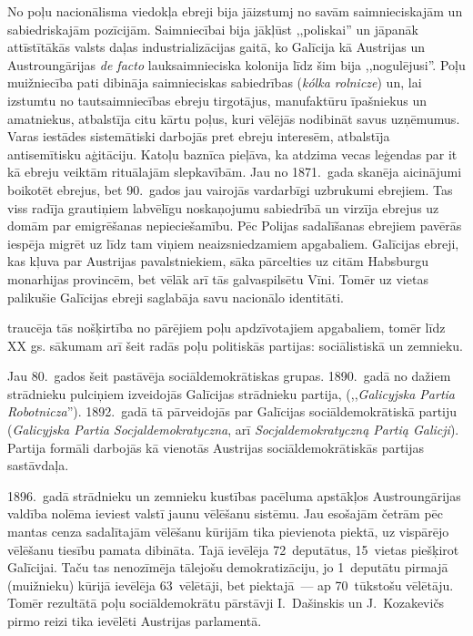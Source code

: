 \documentclass[twoside,a5paper,12pt,fleqn,openany]{extbook}
\newcommand{\pltxti}[1]{\textit{\textpolish{#1}}}
\newcommand{\latxti}[1]{\textit{\textlatin{#1}}}
\begin{document}
No poļu nacionālisma viedokļa ebreji bija jāizstumj no savām saimnieciskajām un sabiedriskajām pozīcijām. Saimniecībai bija jākļūst ,,poliskai'' un jāpanāk attīstītākās valsts daļas industrializācijas gaitā, ko Galīcija kā Austrijas un Austroungārijas \latxti{de facto} lauksaimnieciska kolonija līdz šim bija ,,nogulējusi''. Poļu muižniecība pati dibināja saimnieciskas sabiedrības (\pltxti{kólka rolnicze}) un, lai izstumtu no tautsaimniecības ebreju tirgotājus, manufaktūru īpašniekus un amatniekus, atbalstīja citu kārtu poļus, kuri vēlējās nodibināt savus uzņēmumus. Varas iestādes sistemātiski darbojās pret ebreju interesēm, atbalstīja antisemītisku aģitāciju. Katoļu baznīca pieļāva, ka atdzima vecas leģendas par it kā ebreju veiktām rituālajām slepkavībām. Jau no 1871.~gada skanēja aicinājumi boikotēt ebrejus, bet 90.~gados jau vairojās vardarbīgi uzbrukumi ebrejiem. Tas viss radīja grautiņiem labvēlīgu noskaņojumu sabiedrībā un virzīja ebrejus uz domām par emigrēšanas nepieciešamību. Pēc Polijas sadalīšanas ebrejiem pavērās iespēja migrēt uz līdz tam viņiem neaizsniedzamiem apgabaliem. Galīcijas ebreji, kas kļuva par Austrijas pavalstniekiem, sāka pārcelties uz citām Habsburgu monarhijas provincēm, bet vēlāk arī tās galvaspilsētu Vīni. Tomēr uz vietas palikušie Galīcijas ebreji saglabāja savu nacionālo identitāti.

 traucēja tās nošķirtība no pārējiem poļu apdzīvotajiem apgabaliem, tomēr līdz XX gs. sākumam arī šeit radās poļu politiskās partijas: sociālistiskā un zemnieku.

Jau 80.~gados šeit pastāvēja sociāldemokrātiskas grupas. 1890.~gadā no dažiem strādnieku pulciņiem izveidojās Galīcijas strādnieku partija, (,,\pltxti{Galicyjska Partia Robotnicza}''). 1892.~gadā tā pārveidojās par Galīcijas sociāldemokrātiskā partiju (\pltxti{Galicyjska Partia Socjaldemokratyczna}, arī \pltxti{Socjaldemokratyczną Partią Galicji}). Partija formāli darbojās kā vienotās Austrijas sociāldemokrātiskās partijas sastāvdaļa.

1896.~gadā strādnieku un zemnieku kustības pacēluma apstākļos Austroungārijas valdība nolēma ieviest valstī jaunu vēlēšanu sistēmu. Jau esošajām četrām pēc mantas cenza sadalītajām vēlēšanu kūrijām tika pievienota piektā, uz vispārējo vēlēšanu tiesību pamata dibināta. Tajā ievēlēja 72~deputātus, 15~vietas piešķirot Galīcijai. Taču tas nenozīmēja tālejošu demokratizāciju, jo 1~deputātu pirmajā (muižnieku) kūrijā ievēlēja 63~vēlētāji, bet piektajā~--- ap 70~tūkstošu vēlētāju. Tomēr rezultātā poļu sociāldemokrātu pārstāvji I.~Dašinskis un J.~Kozakevičs pirmo reizi tika ievēlēti Austrijas parlamentā.
\end{document}
